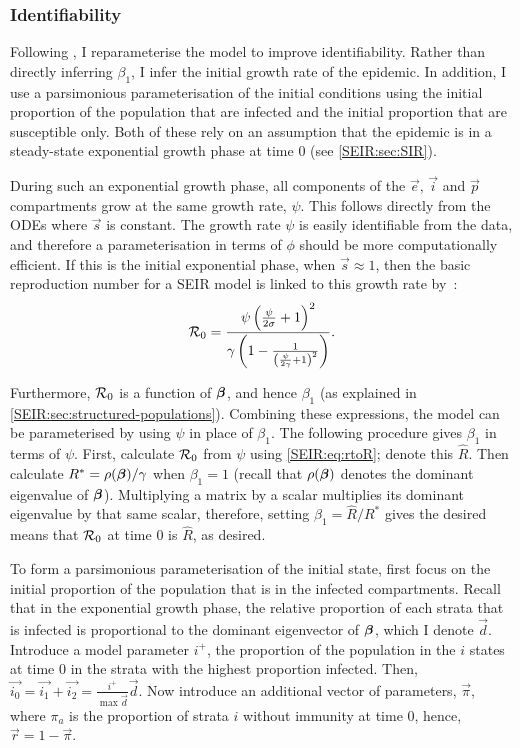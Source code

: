 \documentclass[thesis.tex]{subfiles}
\begin{document}
\subsubsection{Identifiability}

Following \textcite{birrellBayesian}, I reparameterise the model to improve identifiability.
Rather than directly inferring $\beta_1$, I infer the initial growth rate of the epidemic.
In addition, I use a parsimonious parameterisation of the initial conditions using the initial proportion of the population that are infected and the initial proportion that are susceptible only.
Both of these rely on an assumption that the epidemic is in a steady-state exponential growth phase at time 0 (see \cref{SEIR:sec:SIR}).

During such an exponential growth phase, all components of the $\vec{e}$, $\vec{i}$ and $\vec{p}$ compartments grow at the same growth rate, $\psi$.
This follows directly from the ODEs where $\vec{s}$ is constant. 
The growth rate $\psi$ is easily identifiable from the data, and therefore a parameterisation in terms of $\phi$ should be more computationally efficient.
If this is the initial exponential phase, when $\vec{s} \approx 1$, then the basic reproduction number for a SEIR model is linked to this growth rate by~\autocites{birrellBayesian}{wearingAppropriate}:
\begin{align}
    \mathcal{R}_{0} = \frac{\psi \left( \frac{\psi}{2\sigma} + 1 \right)^2}{\gamma \left(1 - \frac{1}{\left(\frac{\psi}{2 \gamma} + 1 \right)^2} \right)} \label{SEIR:eq:rtoR}.
\end{align}

Furthermore, $\mathcal{R}_{0}$ is a function of $\bm{\beta}$, and hence $\beta_1$ (as explained in \cref{SEIR:sec:structured-populations}).
Combining these expressions, the model can be parameterised by using $\psi$ in place of $\beta_1$.
The following procedure gives $\beta_1$ in terms of $\psi$.
First, calculate $\mathcal{R}_{0}$ from $\psi$ using \cref{SEIR:eq:rtoR}; denote this $\hat{R}$.
Then calculate $R^* = \rho(\bm{\beta}) / \gamma$ when $\beta_1=1$ (recall that $\rho(\bm{\beta})$ denotes the dominant eigenvalue of $\bm{\beta}$).
Multiplying a matrix by a scalar multiplies its dominant eigenvalue by that same scalar, therefore, setting $\beta_1 = \hat{R} / R^*$ gives the desired means that $\mathcal{R}_{0}$ at time 0 is $\hat{R}$, as desired.

To form a parsimonious parameterisation of the initial state, first focus on the initial proportion of the population that is in the infected compartments.
Recall that in the exponential growth phase, the relative proportion of each strata that is infected is proportional to the dominant eigenvector of $\bm{\beta}$, which I denote $\vec{d}$.
Introduce a model parameter $i^+$, the proportion of the population in the $i$ states at time 0 in the strata with the highest proportion infected.
Then, $\vec{i_0} = \vec{i_1} + \vec{i_2} = \frac{i^+}{\max \vec{d}} \vec{d}$.
Now introduce an additional vector of parameters, $\vec{\pi}$, where $\pi_a$ is the proportion of strata $i$ without immunity at time 0, hence, $\vec{r} = 1 - \vec{\pi}$.
\end{document}
